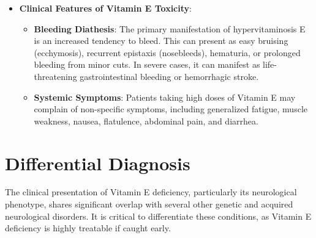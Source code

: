 \begin{itemize}
\begin{itemize}
    \end{itemize}
    \item \textbf{Clinical Features of Vitamin E Toxicity}:
    \begin{itemize}
        \item \textbf{Bleeding Diathesis}: The primary manifestation of hypervitaminosis E is an increased tendency to bleed. This can present as easy bruising (ecchymosis), recurrent epistaxis (nosebleeds), hematuria, or prolonged bleeding from minor cuts. In severe cases, it can manifest as life-threatening gastrointestinal bleeding or hemorrhagic stroke.
        \item \textbf{Systemic Symptoms}: Patients taking high doses of Vitamin E may complain of non-specific symptoms, including generalized fatigue, muscle weakness, nausea, flatulence, abdominal pain, and diarrhea.
    \end{itemize}
\end{itemize}

\section*{Differential Diagnosis}
The clinical presentation of Vitamin E deficiency, particularly its neurological phenotype, shares significant overlap with several other genetic and acquired neurological disorders. It is critical to differentiate these conditions, as Vitamin E deficiency is highly treatable if caught early.

